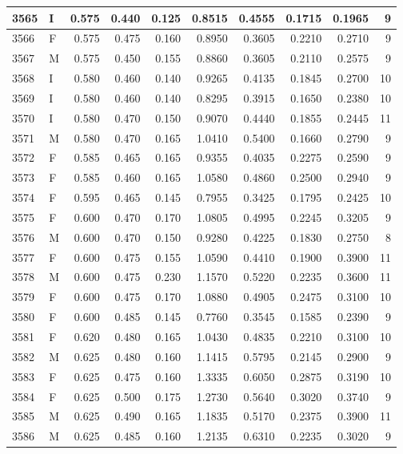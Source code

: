 \documentclass[9pt,twocolumn,twoside,]{pnas-new}
\begin{document}
\begin{tabular}{l|l|r|r|r|r|r|r|r|r}
\hline
3565 & I & 0.575 & 0.440 & 0.125 & 0.8515 & 0.4555 & 0.1715 & 0.1965 & 9\\
\hline
3566 & F & 0.575 & 0.475 & 0.160 & 0.8950 & 0.3605 & 0.2210 & 0.2710 & 9\\
\hline
3567 & M & 0.575 & 0.450 & 0.155 & 0.8860 & 0.3605 & 0.2110 & 0.2575 & 9\\
\hline
3568 & I & 0.580 & 0.460 & 0.140 & 0.9265 & 0.4135 & 0.1845 & 0.2700 & 10\\
\hline
3569 & I & 0.580 & 0.460 & 0.140 & 0.8295 & 0.3915 & 0.1650 & 0.2380 & 10\\
\hline
3570 & I & 0.580 & 0.470 & 0.150 & 0.9070 & 0.4440 & 0.1855 & 0.2445 & 11\\
\hline
3571 & M & 0.580 & 0.470 & 0.165 & 1.0410 & 0.5400 & 0.1660 & 0.2790 & 9\\
\hline
3572 & F & 0.585 & 0.465 & 0.165 & 0.9355 & 0.4035 & 0.2275 & 0.2590 & 9\\
\hline
3573 & F & 0.585 & 0.460 & 0.165 & 1.0580 & 0.4860 & 0.2500 & 0.2940 & 9\\
\hline
3574 & F & 0.595 & 0.465 & 0.145 & 0.7955 & 0.3425 & 0.1795 & 0.2425 & 10\\
\hline
3575 & F & 0.600 & 0.470 & 0.170 & 1.0805 & 0.4995 & 0.2245 & 0.3205 & 9\\
\hline
3576 & M & 0.600 & 0.470 & 0.150 & 0.9280 & 0.4225 & 0.1830 & 0.2750 & 8\\
\hline
3577 & F & 0.600 & 0.475 & 0.155 & 1.0590 & 0.4410 & 0.1900 & 0.3900 & 11\\
\hline
3578 & M & 0.600 & 0.475 & 0.230 & 1.1570 & 0.5220 & 0.2235 & 0.3600 & 11\\
\hline
3579 & F & 0.600 & 0.475 & 0.170 & 1.0880 & 0.4905 & 0.2475 & 0.3100 & 10\\
\hline
3580 & F & 0.600 & 0.485 & 0.145 & 0.7760 & 0.3545 & 0.1585 & 0.2390 & 9\\
\hline
3581 & F & 0.620 & 0.480 & 0.165 & 1.0430 & 0.4835 & 0.2210 & 0.3100 & 10\\
\hline
3582 & M & 0.625 & 0.480 & 0.160 & 1.1415 & 0.5795 & 0.2145 & 0.2900 & 9\\
\hline
3583 & F & 0.625 & 0.475 & 0.160 & 1.3335 & 0.6050 & 0.2875 & 0.3190 & 10\\
\hline
3584 & F & 0.625 & 0.500 & 0.175 & 1.2730 & 0.5640 & 0.3020 & 0.3740 & 9\\
\hline
3585 & M & 0.625 & 0.490 & 0.165 & 1.1835 & 0.5170 & 0.2375 & 0.3900 & 11\\
\hline
3586 & M & 0.625 & 0.485 & 0.160 & 1.2135 & 0.6310 & 0.2235 & 0.3020 & 9\\

\end{tabular}
\end{document}
